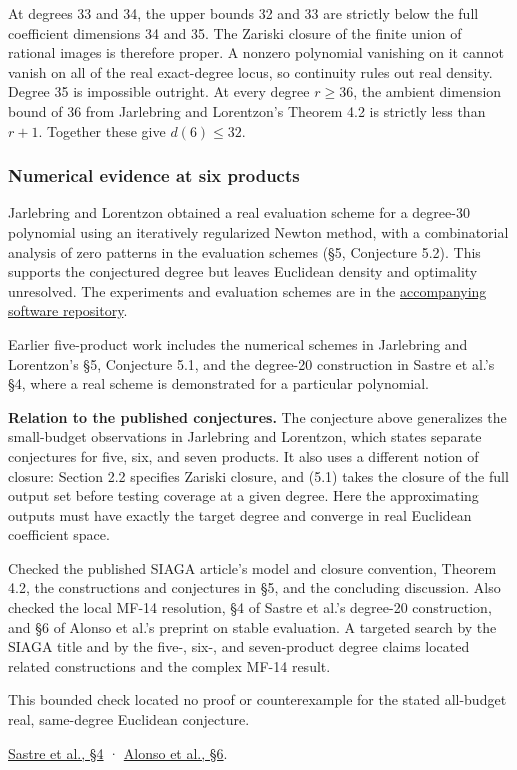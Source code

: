 \documentclass[11pt,a4paper]{article}
\makeatletter
\renewcommand{\subsection}{\Needspace{4\baselineskip}\@startsection{subsection}{2}{0pt}{9pt plus 1pt minus 1pt}{3pt}{\sffamily\bfseries\normalsize\color{ink}}}
\makeatother
\begin{document}
At degrees 33 and 34, the upper bounds 32 and 33 are strictly below the
full coefficient dimensions 34 and 35. The Zariski closure of the finite
union of rational images is therefore proper. A nonzero polynomial
vanishing on it cannot vanish on all of the real exact-degree locus, so
continuity rules out real density. Degree 35 is impossible outright. At
every degree \(r\ge 36\), the ambient dimension bound of 36 from
Jarlebring and Lorentzon's Theorem 4.2 is strictly less than \(r+1\).
Together these give \(d(6)\le 32\).

\subsubsection{Numerical evidence at six
products}\label{numerical-evidence-at-six-products}

Jarlebring and Lorentzon obtained a real evaluation scheme for a
degree-30 polynomial using an iteratively regularized Newton method,
with a combinatorial analysis of zero patterns in the evaluation schemes
(§5, Conjecture 5.2). This supports the conjectured degree but leaves
Euclidean density and optimality unresolved. The experiments and
evaluation schemes are in the
\href{https://github.com/GustafLorentzon/polynomial-set-paper}{accompanying
software repository}.

Earlier five-product work includes the numerical schemes in Jarlebring
and Lorentzon's §5, Conjecture 5.1, and the degree-20 construction in
Sastre et al.'s §4, where a real scheme is demonstrated for a particular
polynomial.

\textbf{Relation to the published conjectures.} The conjecture above
generalizes the small-budget observations in Jarlebring and Lorentzon,
which states separate conjectures for five, six, and seven products. It
also uses a different notion of closure: Section 2.2 specifies Zariski
closure, and (5.1) takes the closure of the full output set before
testing coverage at a given degree. Here the approximating outputs must
have exactly the target degree and converge in real Euclidean
coefficient space.

\subsection{Audit --- 2026-11-27}\label{audit-2026-11-27}

Checked the published SIAGA article's model and closure convention,
Theorem 4.2, the constructions and conjectures in §5, and the concluding
discussion. Also checked the local MF-14 resolution, §4 of Sastre et
al.'s degree-20 construction, and §6 of Alonso et al.'s preprint on
stable evaluation. A targeted search by the SIAGA title and by the
five-, six-, and seven-product degree claims located related
constructions and the complex MF-14 result.

This bounded check located no proof or counterexample for the stated
all-budget real, same-degree Euclidean conjecture.

\href{https://wseas.com/journals/mathematics/2025/b385106-036\%282025\%29.pdf}{Sastre
et al., §4} · \href{https://arxiv.org/html/2603.23143\#S6}{Alonso et
al., §6}.
\end{document}
